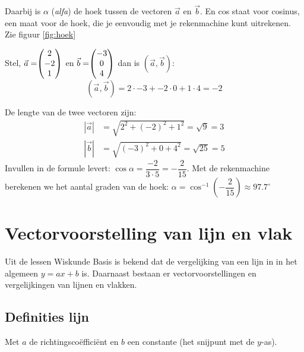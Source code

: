 Daarbij is $\alpha$ (\textit{alfa}) de hoek tussen de vectoren $\vec{a}$ en $\vec{b}.$ En cos staat voor cosinus, een maat voor de hoek, die je eenvoudig met je rekenmachine kunt uitrekenen. Zie figuur \ref{fig:hoek}



Stel, $\vec{a} = \vecdrie{2}{-2}{1} $ en $\vec{b} = \vecdrie{-3}{0}{4} $ dan is $(\vec{a}, \vec{b})$:
\[
    (\vec{a}, \vec{b}) = 2\cdot-3 + -2\cdot0  + 1\cdot4 = -2
\]
 
De lengte van de twee vectoren zijn: 
\begin{align*}
    |\vec{a}| &= \sqrt{2^2+(-2)^2+1^2} = \sqrt{9} = 3 \\ 
    |\vec{b}| &= \sqrt{(-3)^2+0+4^2} = \sqrt{25}=5
\end{align*}
Invullen in de formule levert: $\cos \alpha = \dfrac{-2}{3\cdot5} = - \dfrac{2}{15}. $  
Met de rekenmachine berekenen we het aantal graden van de hoek: $\alpha = \cos^{-1}(-\dfrac{2}{15}) \approx 97.7^{\circ} $ 

\section{Vectorvoorstelling van lijn en vlak}
Uit de lessen Wiskunde Basis is bekend dat de vergelijking van een lijn in \RT in het algemeen $y = ax + b$ is. Daarnaast bestaan er vectorvoorstellingen en vergelijkingen van lijnen en vlakken. 

\subsection{Definities lijn}
 Met $a$ de richtingscoëfficiënt en $b$ een constante (het snijpunt met de $y$-as).




